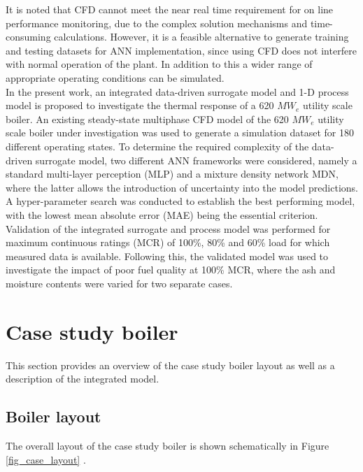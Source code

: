 \documentclass[a4paper,fleqn]{cas-sc}
\begin{document}
It is noted that CFD cannot meet the near real time requirement for on line performance monitoring, due to the complex solution mechanisms and time-consuming calculations. However, it is a feasible alternative to generate training and testing datasets for ANN implementation, since using CFD does not interfere with normal operation of the plant. In addition to this a wider range of appropriate operating conditions can be simulated.\\
 
In the present work, an integrated data-driven surrogate model and 1-D process model is proposed to investigate the thermal response of a 620 $MW_e$ utility scale boiler. An existing steady-state multiphase CFD model \cite{Rawlins2021, INFUB2022} of the 620 $MW_e$ utility scale boiler under investigation was used to generate a simulation dataset for 180 different operating states. To determine the required complexity of the data-driven surrogate model, two different ANN frameworks were considered, namely a standard multi-layer perception (MLP) and a mixture density network MDN, where the latter allows the introduction of uncertainty into the model predictions. A hyper-parameter search was conducted to establish the best performing model, with the lowest mean absolute error (MAE) being the essential criterion. Validation of the integrated surrogate and process model was performed for maximum continuous ratings (MCR) of 100\%, 80\% and 60\% load for which measured data is available. Following this, the validated model was used to investigate the impact of poor fuel quality at 100\% MCR, where the ash and moisture contents were varied for two separate cases.
\newpage
\section{Case study boiler}
This section provides an overview of the case study boiler layout as well as a description of the integrated model.
\subsection{Boiler layout}
The overall layout of the case study boiler is shown schematically in Figure \ref{fig_case_layout} \cite{Rousseau2020}.
\end{document}
